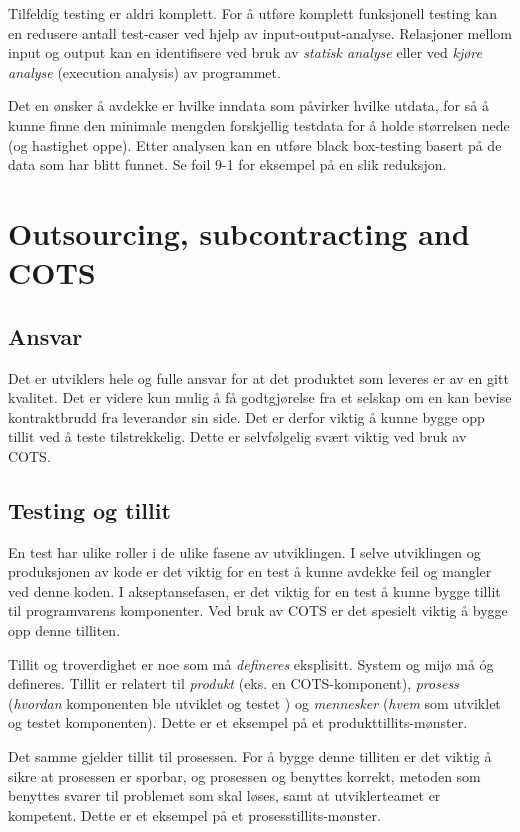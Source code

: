 Tilfeldig testing er aldri komplett. For å utføre komplett funksjonell
testing kan en redusere antall test-caser ved hjelp av
input-output-analyse. Relasjoner mellom input og output kan en
identifisere ved bruk av \emph{statisk analyse} eller ved \emph{kjøre
analyse} (execution analysis) av programmet.

Det en ønsker å avdekke er hvilke inndata som påvirker hvilke utdata,
for så å kunne finne den minimale mengden forskjellig testdata for å
holde størrelsen nede (og hastighet oppe). Etter analysen kan en utføre
black box-testing basert på de data som har blitt funnet. Se foil 9-1
for eksempel på en slik reduksjon.

\section{Outsourcing, subcontracting and COTS}

\subsection{Ansvar}

Det er utviklers hele og fulle ansvar for at det produktet som leveres
er av en gitt kvalitet. Det er videre kun mulig å få godtgjørelse fra et
selskap om en kan bevise kontraktbrudd fra leverandør sin side. Det er
derfor viktig å kunne bygge opp tillit ved å teste tilstrekkelig. Dette
er selvfølgelig svært viktig ved bruk av COTS.

\subsection{Testing og tillit}

En test har ulike roller i de ulike fasene av utviklingen. I selve
utviklingen og produksjonen av kode er det viktig for en test å kunne
avdekke feil og mangler ved denne koden. I akseptansefasen, er det
viktig for en test å kunne bygge tillit til programvarens komponenter.
Ved bruk av COTS er det spesielt viktig å bygge opp denne tilliten.

Tillit og troverdighet er noe som må \emph{defineres} eksplisitt. System
og mijø må óg defineres. Tillit er relatert til \emph{produkt} (eks. en
COTS-komponent), \emph{prosess} (\emph{hvordan} komponenten ble utviklet
og testet ) og \emph{mennesker} (\emph{hvem} som utviklet og testet
komponenten). Dette er et eksempel på et produkttillits-mønster.

Det samme gjelder tillit til prosessen. For å bygge denne tilliten er
det viktig å sikre at prosessen er sporbar, og prosessen og benyttes
korrekt, metoden som benyttes svarer til problemet som skal løses, samt
at utviklerteamet er kompetent. Dette er et eksempel på et
prosesstillits-mønster.

